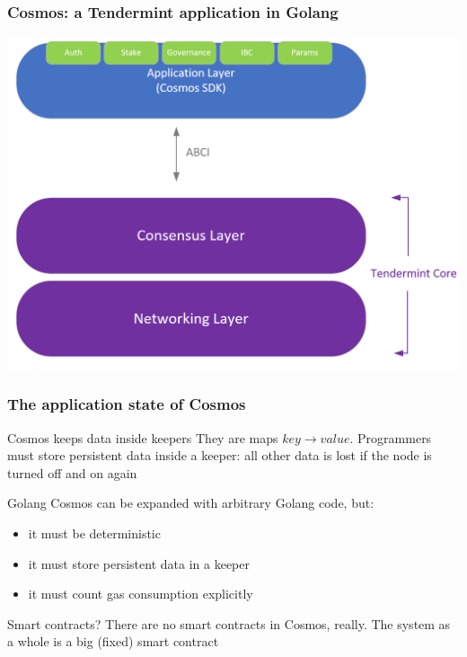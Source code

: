 \documentclass[11pt]{beamer}  %
\begin{document}
\begin{frame}\frametitle{Cosmos: a Tendermint application in Golang}

  \begin{center}
    \includegraphics[scale=0.2,clip=false]{pictures/cosmos.png}
  \end{center}

\end{frame}

\begin{frame}\frametitle{The application state of Cosmos}

  \begin{greenbox}{Cosmos keeps data inside \alert{keepers}}
    They are maps $\mathit{key}\to\mathit{value}$. Programmers must store
    persistent data inside a keeper: all other data is lost if the node
    is turned off and on again
  \end{greenbox}

  \bigskip

  \begin{greenbox}{Golang}
    Cosmos can be expanded with arbitrary Golang code, but:
    \begin{itemize}
    \item it must be deterministic
    \item it must store persistent data in a keeper
    \item it must count gas consumption explicitly
    \end{itemize}
  \end{greenbox}

  \bigskip

  \begin{greenbox}{Smart contracts?}
    There are no smart contracts in Cosmos, really. The system as a whole
    is a big (fixed) smart contract
  \end{greenbox}

\end{frame}
\end{document}
